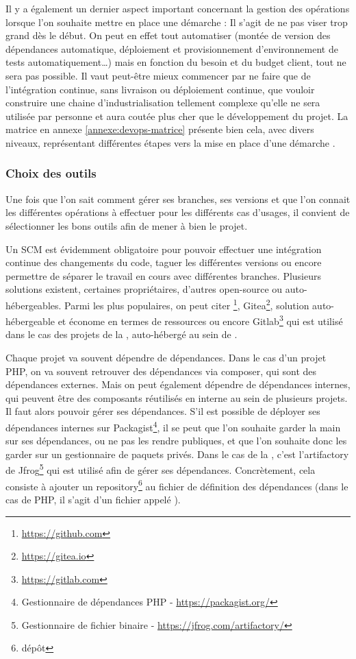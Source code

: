 Il y a également un dernier aspect important concernant la gestion des opérations lorsque l'on souhaite mettre en place une démarche \devops : Il s'agit de ne pas viser trop grand dès le début. On peut en effet tout automatiser (montée de version des dépendances automatique, déploiement et provisionnement d'environnement de tests automatiquement\ldots) mais en fonction du besoin et du budget client, tout ne sera pas possible. Il vaut peut-être mieux commencer par ne faire que de l'intégration continue, sans livraison ou déploiement continue, que vouloir construire une chaine d'industrialisation tellement complexe qu'elle ne sera utilisée par personne et aura coutée plus cher que le développement du projet. La matrice en annexe \ref{annexe:devops-matrice} présente bien cela, avec divers niveaux, représentant différentes étapes vers la mise en place d'une démarche \devops.

\subsubsection{Choix des outils}

Une fois que l'on sait comment gérer ses branches, ses versions et que l'on connait les différentes opérations à effectuer pour les différents cas d'usages, il convient de sélectionner les bons outils afin de mener à bien le projet.

Un \gls{SCM} est évidemment obligatoire pour pouvoir effectuer une intégration continue des changements du code, taguer les différentes versions ou encore permettre de séparer le travail en cours avec différentes branches. Plusieurs solutions existent, certaines propriétaires, d'autres open-source ou auto-hébergeables. Parmi les plus populaires, on peut citer \github\footnote{\url{https://github.com}}, Gitea\footnote{\url{https://gitea.io}}, solution auto-hébergeable et économe en termes de ressources ou encore Gitlab\footnote{\url{https://gitlab.com}} qui est utilisé dans le cas des projets de la \naq, auto-hébergé au sein de \onepoint.

Chaque projet va souvent dépendre de dépendances. Dans le cas d'un projet \gls{PHP}, on va souvent retrouver des dépendances via composer, qui sont des dépendances externes. Mais on peut également dépendre de dépendances internes, qui peuvent être des composants réutilisés en interne au sein de plusieurs projets. Il faut alors pouvoir gérer ses dépendances. S'il est possible de déployer ses dépendances internes sur Packagist\footnote{Gestionnaire de dépendances \gls{PHP} - \url{https://packagist.org/}}, il se peut que l'on souhaite garder la main sur ses dépendances, ou ne pas les rendre publiques, et que l'on souhaite donc les garder sur un gestionnaire de paquets privés. Dans le cas de la \naq, c'est l'\gls{artifactory} de Jfrog\footnote{Gestionnaire de fichier binaire - \url{https://jfrog.com/artifactory/}} qui est utilisé afin de gérer ses dépendances. Concrètement, cela consiste à ajouter un repository\footnote{dépôt} au fichier de définition des dépendances (dans le cas de \gls{PHP}, il s'agit d'un fichier appelé ).

